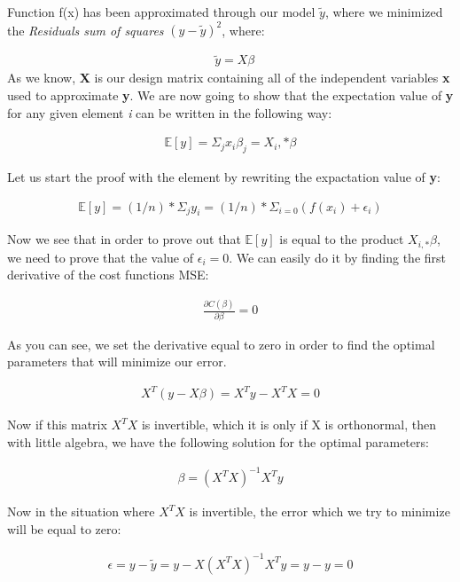 \documentclass[a4paper, 10pt]{article}
\begin{document}
Function f(x) has been approximated through our model \textbf{$\tilde{y}$}, where we minimized the \emph{Residuals sum of squares} \textbf{$(y-\tilde{y})^2$}, where: 

\begin{gather*}
	\textbf{ $\tilde{y}=X\beta$}
\end{gather*}
As we know, \textbf{X} is our design matrix containing all of the independent variables \textbf{x} used to approximate \textbf{y}. We are now going to show that the expectation value of \textbf{y} for any given element \emph{i} can be written in the following way: 

\begin{gather*}
	\mathbb{E}[y] = \Sigma_{j} x_{i} \beta_{j} = X_i,* \beta 
\end{gather*}

Let us start the proof with the element by rewriting the expactation value of \textbf{y}:

\begin{gather*}
	\mathbb{E}[y] = (1/n)*\Sigma_{j} y_{i} = (1/n)*\Sigma_{i=0} (f(x_i) + \epsilon_i) 
\end{gather*}

Now we see that in order to prove out that $\mathbb{E}[y]$ is equal to the product $X_{i,*}\beta$, we need to prove that the value of $\epsilon_{i} = 0$. We can easily do it by finding the first derivative of the cost functions MSE: 

\begin{gather*}
	\frac{\partial C(\beta)}{\partial \beta} = 0
\end{gather*}

As you can see, we set the derivative equal to zero in order to find the optimal parameters that will minimize our error. 

\begin{gather*}
	X^T(y-X\beta) = X^Ty - X^TX = 0
\end{gather*}

Now if this matrix $X^TX$ is invertible, which it is only if X is orthonormal, then with little algebra, we have the following solution for the optimal parameters: 

\begin{gather*}
	\beta = (X^TX)^{-1}X^Ty
\end{gather*}

Now in the situation where $X^TX$ is invertible, the error which we try to minimize will be equal to zero: 

\begin{gather*}
	\epsilon = y - \tilde{y} = y - X(X^TX)^{-1}X^Ty = y - y = 0 
\end{gather*}
\end{document}
